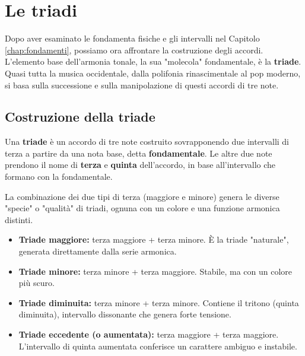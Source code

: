 \chapter{Le triadi}
\label{chap:triadi}

Dopo aver esaminato le fondamenta fisiche e gli intervalli nel Capitolo \ref{chap:fondamenti}, possiamo ora affrontare la costruzione degli accordi. L'elemento base dell'armonia tonale, la sua "molecola" fondamentale, è la \textbf{triade}. Quasi tutta la musica occidentale, dalla polifonia rinascimentale al pop moderno, si basa sulla successione e sulla manipolazione di questi accordi di tre note.

\section{Costruzione della triade}
\label{sec:costruzione_triade}

\begin{definizione}[La triade]
	\label{def:triade}
	Una \textbf{triade} è un accordo di tre note costruito sovrapponendo due intervalli di terza a partire da una nota base, detta \textbf{fondamentale}. Le altre due note prendono il nome di \textbf{terza} e \textbf{quinta} dell'accordo, in base all'intervallo che formano con la fondamentale.
\end{definizione}

La combinazione dei due tipi di terza (maggiore e minore) genera le diverse "specie" o "qualità" di triadi, ognuna con un colore e una funzione armonica distinti.

\begin{definizione}
	\begin{itemize}
	\item \textbf{Triade maggiore:} terza maggiore + terza minore. È la triade "naturale", generata direttamente dalla serie armonica.
	\item \textbf{Triade minore:} terza minore + terza maggiore. Stabile, ma con un colore più scuro.
	\item \textbf{Triade diminuita:} terza minore + terza minore. Contiene il tritono (quinta diminuita), intervallo dissonante che genera forte tensione.
	\item \textbf{Triade eccedente (o aumentata):} terza maggiore + terza maggiore. L'intervallo di quinta aumentata conferisce un carattere ambiguo e instabile.
\end{itemize}
\end{definizione}

